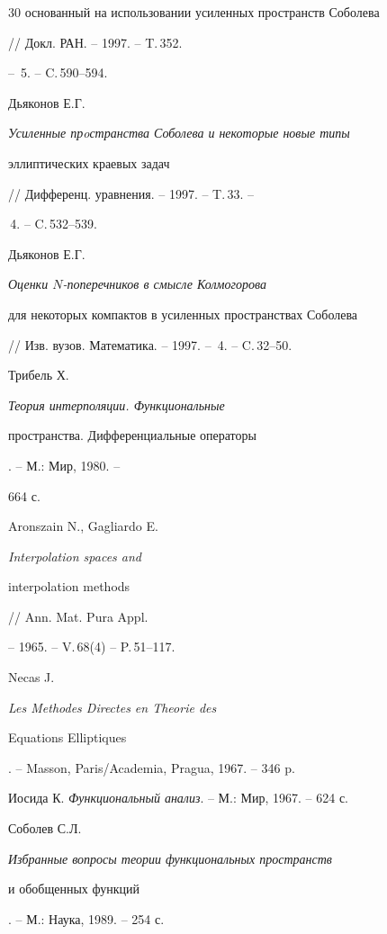 \begin{thebibliography}{30}
{основанный на использовании усиленных пространств Соболева}


// Докл. РАН. -- 1997. -- T.\,352.


-- \No\,5. -- C.\,590--594.







Дьяконов Е.Г. {\em Усиленные прoстранства Соболева и некоторые новые типы


эллиптических краевых задач} // Дифференц. уравнения. -- 1997. -- T.\,33. --


\No\,4. -- C.\,532--539.







Дьяконов Е.Г. {\em Оценки $N$-поперечников в смысле Колмогорова 


для некоторых компактов в усиленных пространствах Соболева}


// Изв. вузов. Математика. -- 1997. -- \No\,4. -- C.\,32--50.







Трибель Х. {\em Теория интерполяции. Функциональные


пространства. Дифференциальные операторы}. -- М.: Мир, 1980. --


664 с.







Aronszain N., Gagliardo E. {\em Interpolation spaces and


interpolation methods} // Ann. Mat. Pura Appl.


-- 1965. -- V.\,68(4) -- P.\,51--117.







Necas J. {\em Les Methodes Directes en Theorie des


Equations Elliptiques}. -- Masson, Paris/Academia, Pragua, 1967. -- 346 p.







Иосида К. {\em Функциональный анализ}. -- М.: Мир, 1967. -- 624 с.







Соболев С.Л. {\em Избранные вопросы теории функциональных пространств


и обобщенных функций}. -- М.: Наука, 1989. -- 254 с.





\end{thebibliography}





